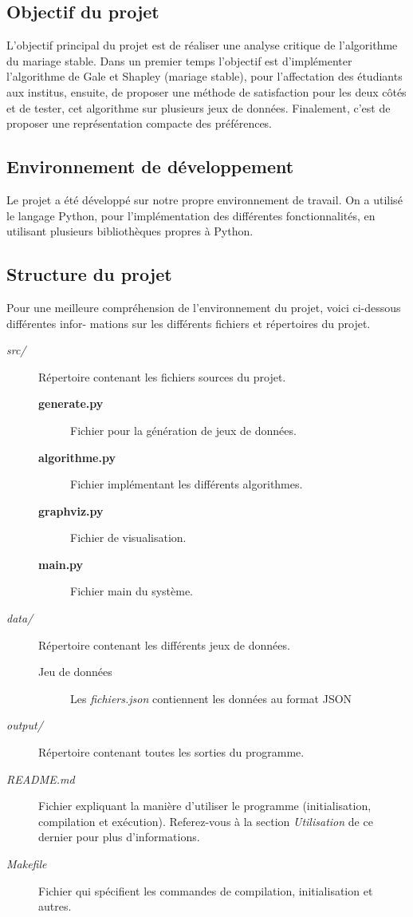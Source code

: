 \documentclass[12pt,titlepage]{article}
\begin{document}
\subsection*{Objectif du projet}
L'objectif principal du projet est de réaliser une analyse critique de l'algorithme du mariage stable. Dans un premier temps l'objectif est d'implémenter l'algorithme de Gale et Shapley (mariage stable), pour l'affectation des étudiants aux institus, ensuite, de proposer une méthode de satisfaction pour les deux côtés et de tester, cet algorithme sur plusieurs jeux de données. Finalement, c'est de proposer une représentation compacte des préférences. 


\subsection*{Environnement de développement}
Le projet a été développé sur notre propre environnement de travail. On a utilisé le langage Python, pour l'implémentation des différentes fonctionnalités, en utilisant plusieurs bibliothèques propres à Python. 


\subsection*{Structure du projet}
Pour une meilleure compréhension de l’environnement du projet, voici ci-dessous différentes infor-
mations sur les différents fichiers et répertoires du projet. 

\begin{description}
	\item[\textit{src/}] Répertoire contenant les fichiers sources du projet.
	\begin{description}
    \item[\textbf{generate.py}] Fichier pour la génération de jeux de données.
    \item[\textbf{algorithme.py}] Fichier implémentant les différents algorithmes.
    \item[\textbf{graphviz.py}] Fichier de visualisation.
    \item[\textbf{main.py}] Fichier main du système. 
  \end{description} 
	\item[\textit{data/}] Répertoire contenant les différents jeux de données.
	\begin{description}
		\item[Jeu de données] Les \textit{fichiers.json} contiennent les données au format JSON
	\end{description}
		\item[\textit{output/}] Répertoire contenant toutes les sorties du programme.	
		\item[\textit{README.md}] Fichier expliquant la manière d'utiliser le programme (initialisation, compilation et exécution). Referez-vous à la section \textit{Utilisation} de ce dernier pour plus d'informations.
		\item[\textit{Makefile}] Fichier qui spécifient les commandes de compilation, initialisation et autres.
\end{description}
\end{document}
